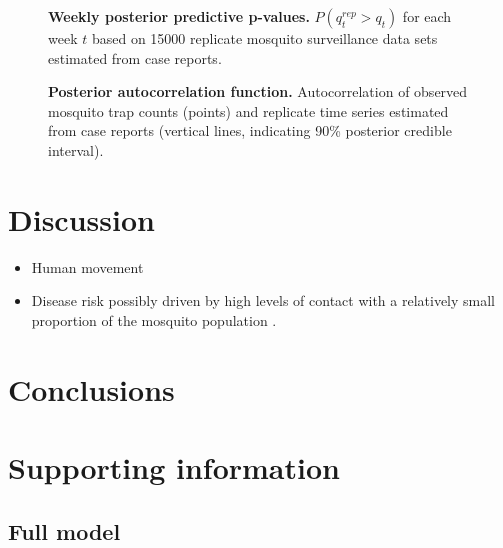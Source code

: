 \documentclass[10pt,letterpaper]{article}
\begin{document}
\begin{figure}[!h]
\caption{{\bf Weekly posterior predictive p-values.}
$P(q^{rep}_t > q_t)$ for each week $t$ based on 15000 replicate mosquito surveillance data sets estimated from case reports.
}
\label{pseries}
\end{figure}

\begin{figure}[!h]
\caption{{\bf Posterior autocorrelation function.}
Autocorrelation of observed mosquito trap counts (points) and replicate time series estimated from case reports (vertical lines, indicating 90\% posterior credible interval). 
}
\label{autocorr}
\end{figure}

\section*{Discussion}

\begin{itemize}
\item Human movement \cite{Adams2009, Cosner2009a, Stoddard2009, Dalziel2013}
\item Disease risk possibly driven by high levels of contact with a relatively small proportion of the mosquito population \cite{Canyon1999}.

\end{itemize}

\section*{Conclusions}

\section*{Supporting information}

\subsection*{Full model}
\end{document}
